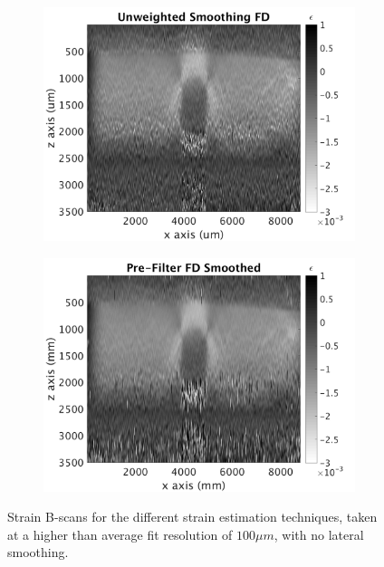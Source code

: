 \begin{figure}[h]
\begin{subfigure}{0.49\textwidth}
        \includegraphics[width=\textwidth]{appendix_figs/uwfd_fr100_lr0.png}
    \end{subfigure}
    \begin{subfigure}{0.49\textwidth}
    	\centering
        \includegraphics[width=\textwidth]{appendix_figs/fdsm_fr100_lr0.png}
    \end{subfigure}    
    \caption{Strain B-scans for the different strain estimation techniques, taken at a higher than average fit resolution of $100\mu m$, with no lateral smoothing.}
	    \label{fr100_lr0}
\end{figure}

